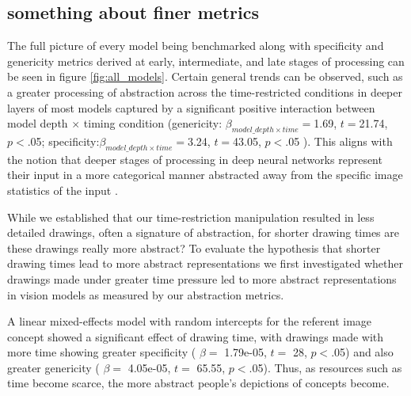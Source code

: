 \documentclass[10pt,letterpaper]{article}
\begin{document}
\subsection{something about finer metrics}

The full picture of every model being benchmarked along with specificity and genericity metrics derived at early, intermediate, and late stages of processing can be seen in figure \ref{fig:all_models}. Certain general trends can be observed, such as a greater processing of abstraction across the time-restricted conditions in deeper layers of most models captured by a significant positive interaction between model depth $\times$ timing condition (genericity: $\beta_{model\_depth \times time} = $1.69, $t =$21.74, $p<$.05; specificity:$\beta_{model\_depth \times time} = $3.24, $t =$43.05, $p<$.05 ). This aligns with the notion that deeper stages of processing in deep neural networks represent their input in a more categorical manner abstracted away from the specific image statistics of the input \cite{yamins2014performance,khaligh2014deep,rajalingham2018large}. 

While we established that our time-restriction manipulation resulted in less detailed drawings, often a signature of abstraction, for shorter drawing times are these drawings really more abstract? 
To evaluate the hypothesis that shorter drawing times lead to more abstract representations we first investigated whether drawings made under greater time pressure led to more abstract representations in vision models as measured by our abstraction metrics.

A linear mixed-effects model with random intercepts for the referent image concept showed a significant effect of drawing time, with drawings made with more time showing greater specificity ( $\beta =$ 1.79e-05, $t=$ 28, $p<$.05) and also greater genericity ( $\beta =$ 4.05e-05, $t=$ 65.55, $p<$.05).
Thus, as resources such as time become scarce, the more abstract people's depictions of concepts become.
\end{document}
